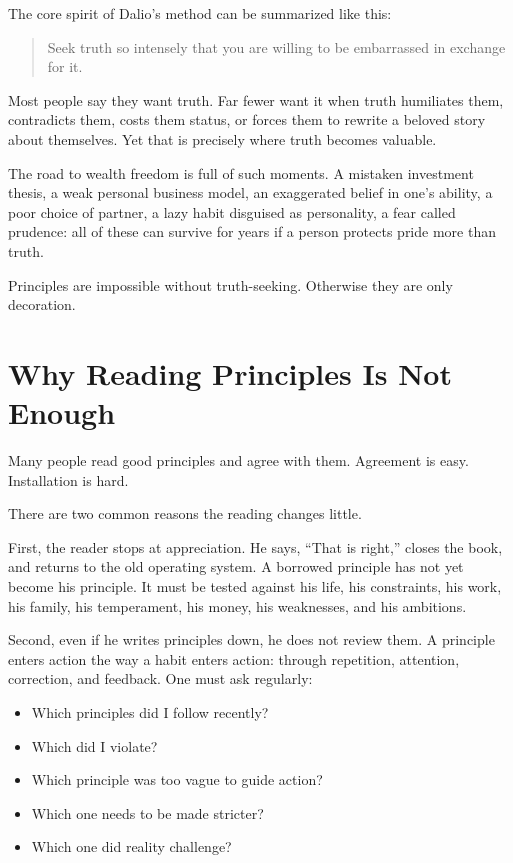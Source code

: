 The core spirit of Dalio's method can be summarized like this:

\begin{quote}
Seek truth so intensely that you are willing to be embarrassed in exchange for it.
\end{quote}

Most people say they want truth. Far fewer want it when truth humiliates them, contradicts them, costs them status, or forces them to rewrite a beloved story about themselves. Yet that is precisely where truth becomes valuable.

The road to wealth freedom is full of such moments. A mistaken investment thesis, a weak personal business model, an exaggerated belief in one's ability, a poor choice of partner, a lazy habit disguised as personality, a fear called prudence: all of these can survive for years if a person protects pride more than truth.

Principles are impossible without truth-seeking. Otherwise they are only decoration.

\section*{Why Reading Principles Is Not Enough}

Many people read good principles and agree with them. Agreement is easy. Installation is hard.

There are two common reasons the reading changes little.

First, the reader stops at appreciation. He says, ``That is right,'' closes the book, and returns to the old operating system. A borrowed principle has not yet become his principle. It must be tested against his life, his constraints, his work, his family, his temperament, his money, his weaknesses, and his ambitions.

Second, even if he writes principles down, he does not review them. A principle enters action the way a habit enters action: through repetition, attention, correction, and feedback. One must ask regularly:

\begin{itemize}
\item Which principles did I follow recently?
\item Which did I violate?
\item Which principle was too vague to guide action?
\item Which one needs to be made stricter?
\item Which one did reality challenge?
\end{itemize}

